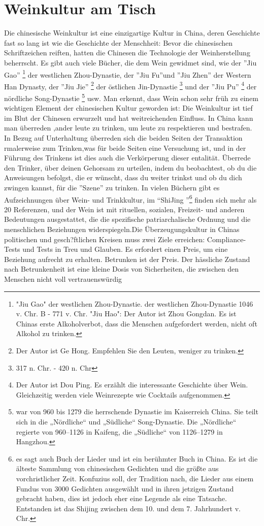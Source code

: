 \section{Weinkultur am Tisch}
Die chinesische Weinkultur ist eine einzigartige Kultur in China, deren Geschichte fast so lang ist wie die Geschichte der Menschheit: Bevor die chinesischen Schriftzeichen reiften, hatten die Chinesen die Technologie der Weinherstellung beherrscht. Es gibt auch viele Bücher, die dem Wein gewidmet sind, wie der ''Jiu Gao'' \footnote{"Jiu Gao" der westlichen Zhou-Dynastie. der westlichen Zhou-Dynastie 1046 v. Chr. B - 771 v. Chr. "Jiu Hao": Der Autor ist Zhou Gongdan. Es ist Chinas erste Alkoholverbot, dass die Menschen aufgefordert werden, nicht oft Alkohol zu trinken.} der westlichen Zhou-Dynastie, der ''Jiu Fu''und ''Jiu Zhen'' der Western Han Dynasty,  der ''Jiu Jie'' \footnote{Der Autor ist Ge Hong. Empfehlen Sie den Leuten, weniger zu trinken.} der östlichen Jin-Dynastie \footnote{317 n. Chr. - 420 n. Chr} und der ''Jiu Pu'' \footnote{Der Autor ist Dou Ping. Es erzählt die interessante Geschichte über Wein. Gleichzeitig werden viele Weinrezepte wie Cocktails aufgenommen.} der nördliche Song-Dynastie \footnote{ war von 960 bis 1279 die herrschende Dynastie im Kaiserreich China. Sie teilt sich in die „Nördliche“ und „Südliche“ Song-Dynastie. Die „Nördliche“ regierte von 960–1126 in Kaifeng, die „Südliche“  von 1126–1279 in Hangzhou.} usw. Man erkennt, dass Wein schon sehr früh zu einem wichtigen Element der chinesischen Kultur geworden ist: Die Weinkultur ist tief im Blut der Chinesen erwurzelt und hat weitreichenden Einfluss. In China kann man überreden ,ander leute zu trinken, um leute zu  respektieren und bestrafen. In Bezug auf Unterhaltung überreden sich die beiden Seiten der Transaktion rmalerweise zum Trinken,was für beide Seiten eine Versuchung ist, und in der Führung des Trinkens ist dies auch die Verkörperung dieser entalität. Überrede den Trinker, über deinen Gehorsam zu urteilen, indem du beobachtest, ob du die Anweisungen befolgst, die er wünscht, dass du weiter trinkst und ob du dich zwingen kannst, für die ''Szene'' zu trinken. In vielen Büchern gibt es Aufzeichnungen über Wein- und Trinkkultur, im “ShiJing ”\footnote{es sagt auch Buch der Lieder und ist ein  berühmter Buch in China. Es ist die älteste Sammlung von chinesischen Gedichten und die größte aus vorchristlicher Zeit. Konfuzius soll, der Tradition nach, die Lieder aus einem Fundus von 3000 Gedichten ausgewählt und in ihren jetzigen Zustand gebracht haben, dies ist jedoch eher eine Legende als eine Tatsache. Entstanden ist das Shijing zwischen dem 10. und dem 7. Jahrhundert v. Chr.} finden sich mehr als 20 Referenzen, und der Wein ist mit rituellen, sozialen, Freizeit- und anderen Bedeutungen ausgestattet, die die spezifische patriarchalische Ordnung und die menschlichen Beziehungen widerspiegeln.Die Überzeugungskultur in Chinas politischen und gesch?ftlichen Kreisen muss zwei Ziele erreichen: Compliance-Tests und Tests in Treu und Glauben. Es erfordert einen Preis, um eine Beziehung aufrecht zu erhalten. Betrunken ist der Preis. Der hässliche Zustand nach Betrunkenheit ist eine kleine Dosis von Sicherheiten, die zwischen den Menschen nicht voll vertrauenswürdig 